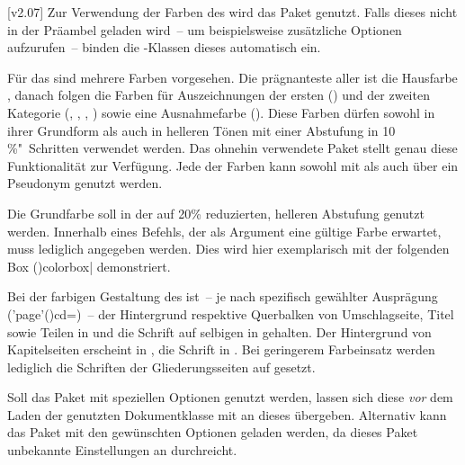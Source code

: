 \begin{DeclareEntity}{}
[v2.07]
Zur Verwendung der Farben des \CDs wird das Paket  
genutzt. Falls dieses nicht in der Präambel geladen wird~-- um beispielsweise 
zusätzliche Optionen aufzurufen~-- binden die \TUDScript-Klassen dieses 
automatisch ein.

Für das \CD sind mehrere Farben vorgesehen. Die prägnanteste aller ist die 
Hausfarbe , danach folgen die Farben für Auszeichnungen der ersten
() und der zweiten Kategorie (, , 
, ) sowie eine Ausnahmefarbe (). 
Diese Farben dürfen sowohl in ihrer Grundform als auch in helleren Tönen mit 
einer Abstufung in 10\,\%"~Schritten verwendet werden. Das ohnehin verwendete 
Paket  stellt genau diese Funktionalität zur Verfügung. Jede 
der Farben kann sowohl mit  als auch über ein 
Pseudonym  genutzt werden.
%
\begin{Example*}
Die Grundfarbe  soll in der auf 20\% reduzierten, helleren 
Abstufung genutzt werden. Innerhalb eines Befehls, der als Argument eine 
gültige Farbe erwartet, muss lediglich  angegeben werden. 
Dies wird hier exemplarisch mit der folgenden \colorbox{HKS44!20}{%
  Box \Macro(){colorbox|}%
}
demonstriert.
\end{Example*}
%
Bei der farbigen Gestaltung des \CDs ist~-- je nach spezifisch gewählter 
Ausprägung (\Option'page'(){cd=\PMisc})~-- der Hintergrund respektive Querbalken
von Umschlagseite, Titel sowie Teilen in  und die Schrift auf 
selbigen in  gehalten. Der Hintergrund von Kapitelseiten 
erscheint in , die Schrift in . Bei geringerem 
Farbeinsatz werden lediglich die Schriften der Gliederungsseiten auf 
 gesetzt.

Soll das Paket  mit speziellen Optionen genutzt werden, lassen 
sich diese \emph{vor} dem Laden der genutzten Dokumentklasse mit 
 an dieses 
übergeben. Alternativ kann das Paket  mit den gewünschten 
Optionen geladen werden, da dieses Paket unbekannte Einstellungen an 
 durchreicht.




\end{DeclareEntity}
